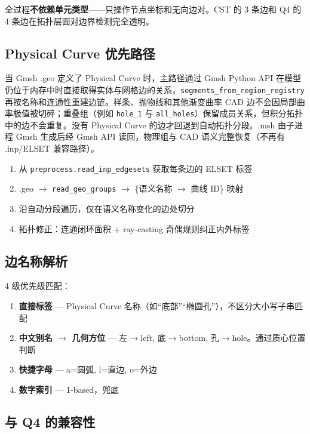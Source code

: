 \documentclass[12pt,a4paper]{ctexart}
\begin{document}
全过程\textbf{不依赖单元类型}——只操作节点坐标和无向边对。CST 的 3 条边和 Q4 的 4 条边在拓扑层面对边界检测完全透明。

\subsection{Physical Curve 优先路径}

当 Gmsh .geo 定义了 Physical Curve 时，主路径通过 Gmsh Python API 在模型仍位于内存中时直接取得实体与网格边的关系，\texttt{segments\_from\_region\_registry} 再按名称和连通性重建边链。样条、抛物线和其他渐变曲率 CAD 边不会因局部曲率极值被切碎；重叠组（例如 \texttt{hole\_1} 与 \texttt{all\_holes}）保留成员关系，但积分拓扑中的边不会重复。没有 Physical Curve 的边才回退到自动拓扑分段。.msh 由子进程 Gmsh 生成后经 Gmsh API 读回，物理组与 CAD 语义完整恢复（不再有 .inp/ELSET 兼容路径）。

\begin{enumerate}[leftmargin=*]
  \item 从 \texttt{preprocess.read\_inp\_edgesets} 获取每条边的 ELSET 标签
  \item .geo $\rightarrow$ \texttt{read\_geo\_groups} $\rightarrow$ \{语义名称 $\rightarrow$ 曲线 ID\} 映射
  \item 沿自动分段遍历，仅在语义名称变化的边处切分
  \item 拓扑修正：连通闭环面积 + ray-casting 奇偶规则纠正内外标签
\end{enumerate}

\subsection{边名称解析}

4 级优先级匹配：

\begin{enumerate}[leftmargin=*]
  \item \textbf{直接标签} — Physical Curve 名称（如``底部''``椭圆孔''），不区分大小写子串匹配
  \item \textbf{中文别名 $\rightarrow$ 几何方位} — 左$\rightarrow$left, 底$\rightarrow$bottom, 孔$\rightarrow$hole。通过质心位置判断
  \item \textbf{快捷字母} — a=圆弧, l=直边, o=外边
  \item \textbf{数字索引} — 1-based，兜底
\end{enumerate}

\subsection{与 Q4 的兼容性}
\end{document}
